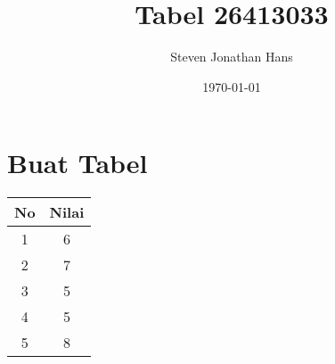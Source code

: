 \documentclass[12pt]{article}
\title{Tabel 26413033}
\author{Steven Jonathan Hans}
\date{\today}
\begin{document}
 
\maketitle
 
\section{Buat Tabel}

\begin{flushleft}
 \begin{tabular}{| c | c |} 
 \hline
 No & Nilai\\ [0.5ex] 
 \hline
 1 & 6 \\ 
 2 & 7 \\
 3 & 5 \\
 4 & 5 \\
 5 & 8 \\ [1ex] 
 \hline
\end{tabular}
\end{flushleft}
\end{document}
